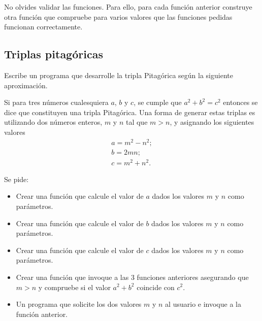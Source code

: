 No olvides validar las funciones. Para ello, para cada función anterior construye otra función que compruebe para varios valores que las funciones pedidas funcionan correctamente.




\separacion
\subsection{Triplas pitagóricas}

Escribe un programa que desarrolle la tripla Pitagórica según la siguiente aproximación. 

Si para tres números cualesquiera $a$, $b$ y $c$, se cumple que $a^2 + b^2 = c^2 $ entonces se dice que constituyen una tripla Pitagórica. Una forma de generar estas triplas es utilizando dos números enteros, $m$ y $n$ tal que $m > n$, y asignando los siguientes valores
$$
\begin{array}{l}
a = m^2 - n^2; \\
b = 2mn; \\
 c = m^2 + n^2. 
 \end{array}
$$

Se pide:
\begin{itemize}
\item Crear una función que calcule el valor de $a$ dados los valores $m$ y $n$ como parámetros. 
\item Crear una función que calcule el valor de $b$ dados los valores $m$ y $n$ como parámetros. 
\item Crear una función que calcule el valor de $c$ dados los valores $m$ y $n$ como parámetros. 
\item Crear una función que invoque a las 3 funciones anteriores asegurando que $m>n$ y compruebe si el valor $a^2+b^2$ coincide con $c^2$.
\item Un programa que solicite los dos valores $m$ y $n$ al usuario e invoque a la función anterior.
\end{itemize}






